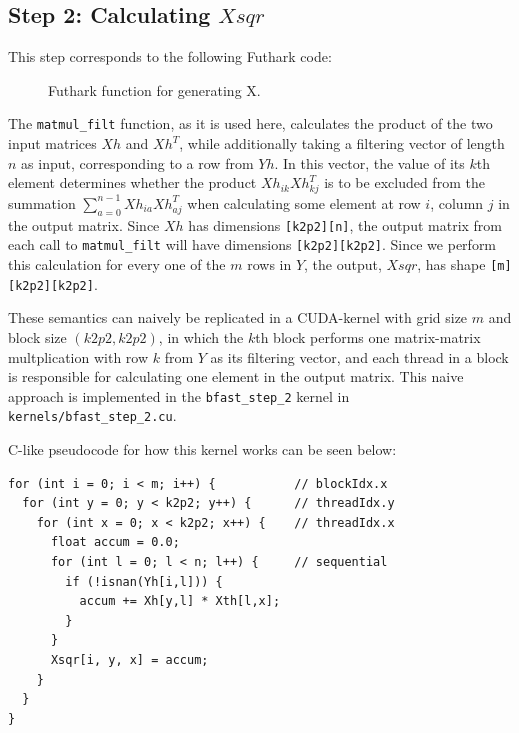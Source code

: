 \subsection{
  Step 2: Calculating \(Xsqr\)
}
This step corresponds to the following Futhark code:
\begin{figure}[H]
    \centering
    \caption{Futhark function for generating X.}
    \label{fut:kernel1}
\end{figure}

The \texttt{matmul\_filt} function, as it is used here, calculates the product
of the two input matrices \(Xh\) and \(Xh^T\), while additionally taking a
filtering vector of length \(n\) as input, corresponding to a row from \(Yh\).
In this vector, the value of its \(k\)th element determines whether the product
\(Xh_{ik}Xh^T_{kj}\) is to be excluded from the summation
\(\sum\limits_{a=0}^{n-1} Xh_{ia}Xh^T_{aj}\) when calculating some element
at row \(i\), column \(j\) in the output matrix.
Since \(Xh\) has dimensions \texttt{[k2p2][n]}, the output matrix from each call
to \texttt{matmul\_filt} will have dimensions \texttt{[k2p2][k2p2]}.
Since we perform this calculation for every one of the \(m\) rows in \(Y\), the
output, \(Xsqr\), has shape \texttt{[m][k2p2][k2p2]}.

These semantics can naively be replicated in a CUDA-kernel with grid size \(m\)
and block size \( (k2p2, k2p2)\), in which the \(k\)th block performs one
matrix-matrix multplication with row \(k\) from \(Y\) as its filtering vector,
and each thread in a block is responsible for calculating one element in the
output matrix.
This naive approach is implemented in the \texttt{bfast\_step\_2} kernel in
\texttt{kernels/bfast\_step\_2.cu}.

C-like pseudocode for how this kernel works can be seen below:
\begin{verbatim}
for (int i = 0; i < m; i++) {           // blockIdx.x
  for (int y = 0; y < k2p2; y++) {      // threadIdx.y
    for (int x = 0; x < k2p2; x++) {    // threadIdx.x
      float accum = 0.0;
      for (int l = 0; l < n; l++) {     // sequential
        if (!isnan(Yh[i,l])) {
          accum += Xh[y,l] * Xth[l,x];
        }
      }
      Xsqr[i, y, x] = accum;
    }
  }
}
\end{verbatim}

